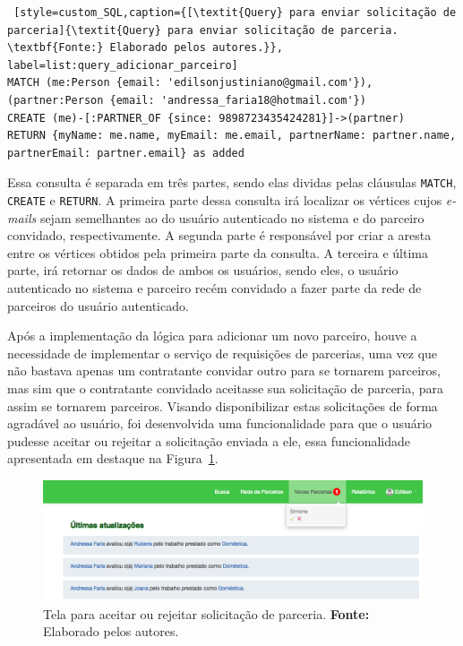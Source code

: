 \begin{lstlisting} [style=custom_SQL,caption={[\textit{Query} para enviar solicitação de parceria]{\textit{Query} para enviar solicitação de parceria. \textbf{Fonte:} Elaborado pelos autores.}}, label=list:query_adicionar_parceiro] 	
MATCH (me:Person {email: 'edilsonjustiniano@gmail.com'}),
(partner:Person {email: 'andressa_faria18@hotmail.com'})
CREATE (me)-[:PARTNER_OF {since: 9898723435424281}]->(partner)
RETURN {myName: me.name, myEmail: me.email, partnerName: partner.name, 
partnerEmail: partner.email} as added
\end{lstlisting}

\par Essa consulta é separada em três partes, sendo elas dividas pelas cláusulas \texttt{MATCH}, \texttt{CREATE} e \texttt{RETURN}. A primeira parte dessa consulta irá localizar os vértices cujos \textit{e-mails} sejam semelhantes ao do usuário autenticado no sistema e do parceiro convidado, respectivamente. A segunda parte é responsável por criar a aresta entre os vértices obtidos pela primeira parte da consulta. A terceira e última parte, irá retornar os dados de ambos os usuários, sendo eles, o usuário autenticado no sistema e parceiro recém convidado a fazer parte da rede de parceiros do usuário autenticado.

\par Após a implementação da lógica para adicionar um novo parceiro, houve a necessidade de implementar o serviço de requisições de parcerias, uma vez que não bastava apenas um contratante convidar outro para se tornarem parceiros, mas sim que o contratante convidado aceitasse sua solicitação de parceria, para assim se tornarem parceiros. Visando disponibilizar estas solicitações de forma agradável ao usuário, foi desenvolvida uma funcionalidade para que o usuário pudesse aceitar ou rejeitar a solicitação enviada a ele, essa funcionalidade apresentada em destaque na Figura~\ref{fig:aceitar_rejeitar_solicitacao_parceria}.

\begin{figure}[h!]
	\centerline{\includegraphics[scale=0.4]{./imagens/aceitar_rejeitar_solicitacao_parceria.png}}
	\caption[Tela para aceitar ou rejeitar solicitação de parceria.]
	{Tela para aceitar ou rejeitar solicitação de parceria. \textbf{Fonte:} Elaborado pelos autores.}
	\label{fig:aceitar_rejeitar_solicitacao_parceria}
\end{figure}

